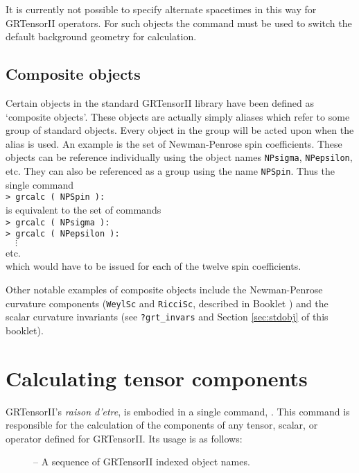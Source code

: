 \documentclass{article}
\begin{document}
It is currently not possible to specify alternate spacetimes in this way
for GRTensorII operators. For such objects the  command
must be used to switch the default background geometry for calculation.
%
\subsection{Composite objects}
%
Certain objects in the standard GRTensorII library have been defined
as `composite objects'. These objects are actually simply aliases
which refer to some group of standard objects. Every object in the
group will be acted upon when the alias is used. An example is the set
of Newman-Penrose spin coefficients. These objects can be reference
individually using the object names \texttt{NPsigma},
\texttt{NPepsilon}, etc. They can also be referenced as a group using
the name \texttt{NPSpin}. Thus the single command\\

\noindent\texttt{> grcalc ( NPSpin ):}\\

\noindent is equivalent to the set of commands\\

\noindent\texttt{> grcalc ( NPsigma ):}\\
\texttt{> grcalc ( NPepsilon ):}\\
$\quad\vdots$\\
etc.\\

\noindent which would have to be issued for each of the twelve spin
coefficients.

Other notable examples of composite objects include the Newman-Penrose
curvature components (\texttt{WeylSc} and \texttt{RicciSc}, described
in Booklet \grBasisRef) and the scalar curvature invariants (see
\texttt{?grt\_invars} and Section \ref{sec:stdobj} of this booklet).
%
\section{Calculating tensor components} \label{sec:grcalc}
%
GRTensorII's \textit{raison d'etre}, is embodied in a single command,
. This command is responsible for the calculation of the
components of any tensor, scalar, or operator defined for
GRTensorII. Its usage is as follows:\\
%
\begin{cmdspec}
  \label{spec:grcalc}

  \begin{description}
    \item[] -- A sequence of GRTensorII indexed object names.
  \end{description}

\end{cmdspec}
\end{document}
